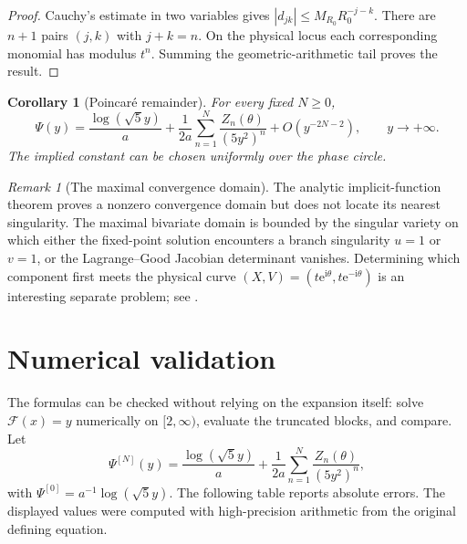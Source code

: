 \documentclass[11pt,oneside]{article}
\theoremstyle{plain}
\newtheorem{corollary}[theorem]{Corollary}
\theoremstyle{definition}
\theoremstyle{remark}
\newtheorem{remark}[theorem]{Remark}
\newcommand{\e}{\mathrm{e}}
\newcommand{\ii}{\mathrm{i}}
\newcommand{\Fcal}{\mathcal{F}}
\newcommand{\abs}[1]{\left\lvert#1\right\rvert}
\begin{document}
\begin{proof}
Cauchy's estimate in two variables gives
\(\abs{d_{jk}}\le M_{R_0}R_0^{-j-k}\).  There are \(n+1\) pairs
\((j,k)\) with \(j+k=n\).  On the physical locus each corresponding monomial
has modulus \(t^n\).  Summing the geometric-arithmetic tail proves the result.
\end{proof}

\begin{corollary}[Poincar\'e remainder]
\label{cor:Poincare-remainder}
For every fixed \(N\ge0\),
\begin{equation}
 \Psi(y)=\frac{\log(\sqrt5y)}a
 +\frac1{2a}\sum_{n=1}^{N}\frac{Z_n(\theta)}{(5y^2)^n}
 +O(y^{-2N-2}),
 \qquad y\to+\infty.
 \label{eq:Poincare-remainder}
\end{equation}
The implied constant can be chosen uniformly over the phase circle.
\end{corollary}

\begin{remark}[The maximal convergence domain]
The analytic implicit-function theorem proves a nonzero convergence domain but
does not locate its nearest singularity.  The maximal bivariate domain is
bounded by the singular variety on which either the fixed-point solution
encounters a branch singularity \(u=1\) or \(v=1\), or the Lagrange--Good
Jacobian determinant vanishes.  Determining which component first meets the
physical curve \((X,V)=(t\e^{\ii\theta},t\e^{-\ii\theta})\) is an interesting
separate problem; see .
\end{remark}

\section{Numerical validation}
\label{sec:numerics}

The formulas can be checked without relying on the expansion itself: solve
\(\Fcal(x)=y\) numerically on \([2,\infty)\), evaluate the truncated blocks,
and compare.  Let
\begin{equation}
 \Psi^{[N]}(y)=\frac{\log(\sqrt5y)}a
 +\frac1{2a}\sum_{n=1}^{N}\frac{Z_n(\theta)}{(5y^2)^n},
 \label{eq:PsiN}
\end{equation}
with \(\Psi^{[0]}=a^{-1}\log(\sqrt5y)\).  The following table reports absolute
errors.  The displayed values were computed with high-precision arithmetic
from the original defining equation.
\end{document}
